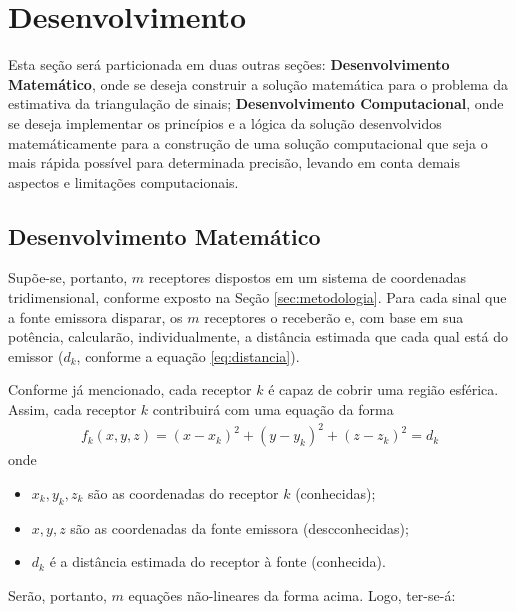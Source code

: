 	\section{Desenvolvimento}
	\label{sec:dev}
	Esta seção será particionada em duas outras seções: \textbf{Desenvolvimento Matemático}, onde
	se deseja construir a solução matemática para o problema da estimativa da triangulação de sinais;
	\textbf{Desenvolvimento Computacional}, onde se deseja implementar os princípios e a lógica da
	solução desenvolvidos matemáticamente para a construção de uma solução computacional que seja
	o mais rápida possível para determinada precisão, levando em conta demais aspectos e
	limitações computacionais.

	\subsection{Desenvolvimento Matemático}
	\label{sec:dev_math}
	Supõe-se, portanto, $m$ receptores dispostos em um sistema de coordenadas tridimensional, conforme
	exposto na Seção \ref{sec:metodologia}. Para cada sinal que a fonte emissora disparar, os $m$
	receptores o receberão e, com base em sua potência, calcularão, individualmente, a distância
	estimada que cada qual está do emissor ($d_k$, conforme a equação \ref{eq:distancia}).

	Conforme já mencionado, cada receptor $k$ é capaz de cobrir uma região esférica.
	Assim, cada receptor $k$ contribuirá com uma equação da forma
	\begin{align}
		f_k(x,y,z) = (x - x_k)^2 + (y - y_k)^2 + (z - z_k)^2 = d_k \label{eq:receptor}
	\end{align}
	onde
	\begin{itemize}
		\item $x_k, y_k, z_k$ são as coordenadas do receptor $k$ (conhecidas);
		\item $x, y, z$ são as coordenadas da fonte emissora (descconhecidas);
		\item $d_k$ é a distância estimada do receptor à fonte (conhecida).
	\end{itemize}

	Serão, portanto, $m$ equações não-lineares da forma acima. Logo, ter-se-á:

